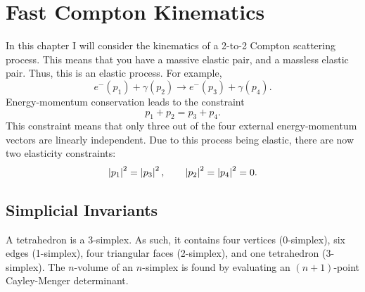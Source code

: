 \chapter{Fast Compton Kinematics}
In this chapter I will consider the kinematics of a 2-to-2 Compton scattering process. This means that you have a massive elastic pair, and a massless elastic pair. Thus, this is an elastic process. For example,
\begin{equation}
	e^{-}(p_{1}) + \gamma(p_{2}) \longrightarrow e^{-}(p_{3}) + \gamma(p_{4}).
\end{equation}
Energy-momentum conservation leads to the constraint
\begin{equation}
	p_{1} + p_{2} = p_{3} + p_{4}.
\end{equation}
This constraint means that only three out of the four external energy-momentum vectors are linearly independent. Due to this process being elastic, there are now two elasticity constraints:
\begin{equation}
	\left\lvert p_{1} \right\rvert^{2} = \left\lvert p_{3} \right\rvert^{2}, \qquad \left\lvert p_{2} \right\rvert^{2} = \left\lvert p_{4} \right\rvert^{2} = 0.
\end{equation}
\section{Simplicial Invariants}
A tetrahedron is a 3-simplex. As such, it contains four vertices (0-simplex), six edges (1-simplex), four triangular faces (2-simplex), and one tetrahedron (3-simplex). The $n$-volume of an $n$-simplex is found by evaluating an $(n+1)$-point Cayley-Menger determinant. 
